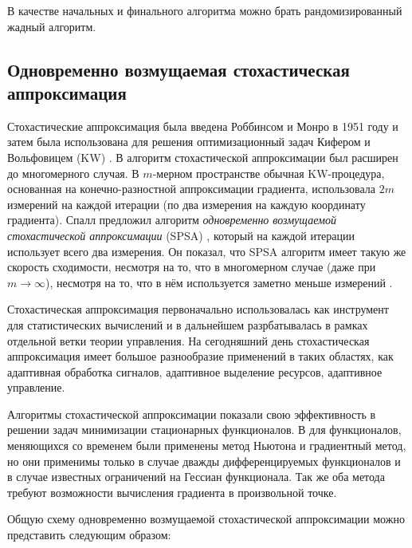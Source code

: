 В качестве начальных и финального алгоритма можно брать рандомизированный жадный алгоритм.



\subsection{Одновременно возмущаемая стохастическая аппроксимация}
Стохастические аппроксимация была введена Роббинсом и Монро в 1951 году \cite{Robbins&Monro:1951} и затем была использована для решения оптимизационный задач Кифером и Вольфовицем (KW) \cite{Kiefer&Wolfowitz:1952}. В \cite{Blum:1954} алгоритм стохастической аппроксимации был расширен до многомерного случая. В $m$-мерном пространстве обычная KW-процедура, основанная на конечно-разностной аппроксимации градиента, использовала $2m$ измерений на каждой итерации (по два измерения на каждую координату градиента). Спалл предложил алгоритм \emph{одновременно возмущаемой стохастической аппроксимации} (SPSA) \cite{Spall:1992}, который на каждой итерации использует всего два измерения. Он показал, что SPSA алгоритм имеет такую же скорость сходимости, несмотря на то, что в многомерном случае (даже при $m \to \infty$), несмотря на то, что в нём используется заметно меньше измерений \cite{Spall:2005}.

Стохастическая аппроксимация первоначально использовалась как инструмент для статистических вычислений и в дальнейшем разрбатывалась в рамках отдельной ветки теории управления. На сегодняшний день стохастическая аппроксимация имеет большое разнообразие применений в таких областях, как адаптивная обработка сигналов, адаптивное выделение ресурсов, адаптивное управление.

Алгоритмы стохастической аппроксимации показали свою эффективность в решении задач минимизации стационарных функционалов. В \cite{Polyak:1987} для функционалов, меняющихся со временем были применены метод Ньютона и градиентный метод, но они применимы только в случае дважды дифференцируемых функционалов и в случае известных ограничений на Гессиан функционала. Так же оба метода требуют возможности вычисления градиента в произвольной точке.

Общую схему одновременно возмущаемой стохастической аппроксимации можно представить следующим образом:

